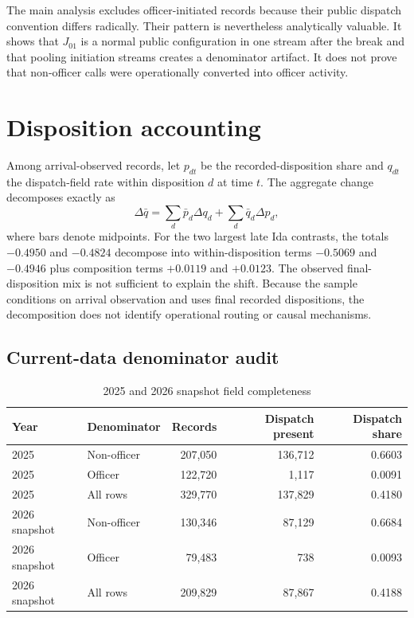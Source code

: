 \documentclass[11pt]{article}
\begin{document}
The main analysis excludes officer-initiated records because their public dispatch convention differs radically. Their pattern is nevertheless analytically valuable. It shows that $J_{01}$ is a normal public configuration in one stream after the break and that pooling initiation streams creates a denominator artifact. It does not prove that non-officer calls were operationally converted into officer activity.

\section{Disposition accounting}

Among arrival-observed records, let $p_{dt}$ be the recorded-disposition share and $q_{dt}$ the dispatch-field rate within disposition $d$ at time $t$. The aggregate change decomposes exactly as
\begin{equation}
\Delta \bar q
=\sum_d \bar p_d\Delta q_d+\sum_d \bar q_d\Delta p_d,
\end{equation}
where bars denote midpoints. For the two largest late Ida contrasts, the totals $-0.4950$ and $-0.4824$ decompose into within-disposition terms $-0.5069$ and $-0.4946$ plus composition terms $+0.0119$ and $+0.0123$. The observed final-disposition mix is not sufficient to explain the shift. Because the sample conditions on arrival observation and uses final recorded dispositions, the decomposition does not identify operational routing or causal mechanisms.

\subsection{Current-data denominator audit}

\begin{table}[t]
\centering
\caption{2025 and 2026 snapshot field completeness}
\label{tab:currentsupp}
\begin{tabular}{@{}llrrr@{}}
\toprule
Year & Denominator & Records & Dispatch present & Dispatch share \\
\midrule
2025 & Non-officer & 207,050 & 136,712 & 0.6603 \\
2025 & Officer & 122,720 & 1,117 & 0.0091 \\
2025 & All rows & 329,770 & 137,829 & 0.4180 \\
2026 snapshot & Non-officer & 130,346 & 87,129 & 0.6684 \\
2026 snapshot & Officer & 79,483 & 738 & 0.0093 \\
2026 snapshot & All rows & 209,829 & 87,867 & 0.4188 \\
\bottomrule
\end{tabular}
\end{table}
\end{document}
